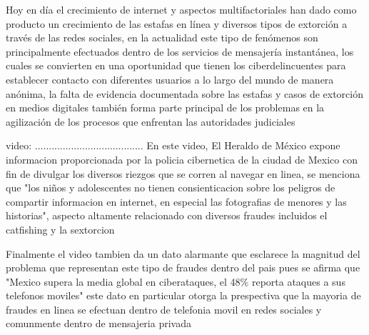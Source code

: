 \documentclass{article}
\begin{document}
Hoy en día el crecimiento de internet y aspectos multifactoriales han dado como producto un crecimiento de las estafas en línea y diversos tipos de extorción a través de las redes sociales, en la actualidad este tipo de fenómenos son principalmente efectuados dentro de los servicios de mensajería instantánea, los cuales se convierten en una oportunidad que tienen los
ciberdelincuentes para establecer contacto con diferentes usuarios a lo largo del mundo de manera anónima, la falta de
evidencia documentada sobre las estafas y casos de extorción en medios digitales también forma parte principal de los problemas en la agilización de los procesos que enfrentan las autoridades judiciales

video: 
.......................................
En este video, El Heraldo de México expone informacion proporcionada por la policia cibernetica de la ciudad de Mexico con fin de divulgar los diversos riezgos que se corren al navegar en linea, se menciona que "los niños y adolescentes no tienen consienticacion sobre los peligros de compartir informacion en internet, en especial las fotografias de menores y las historias", aspecto altamente relacionado con diversos fraudes incluidos el catfishing y la sextorcion 




Finalmente el video tambien da un dato alarmante que esclarece la magnitud del problema que representan este tipo de fraudes dentro del pais pues se afirma que  "Mexico supera la media global en ciberataques, el 48\% reporta ataques a sus telefonos moviles" este dato en particular otorga la prespectiva que la mayoria de fraudes en linea se efectuan dentro de telefonia movil en redes sociales y comunmente dentro de mensajeria privada 
\cite{heraldo1youtube}
\end{document}

